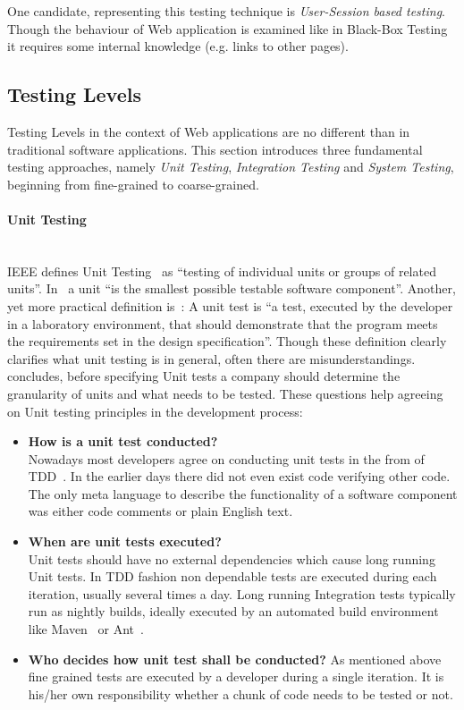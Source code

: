 \documentclass[12pt, notitlepage]{article}
\begin{document}
One candidate, representing this testing technique is \textit{User-Session based testing}. Though the behaviour of Web application is examined like in
Black-Box Testing it requires some internal knowledge (e.g. links to other pages).
\subsection{Testing Levels}
Testing Levels in the context of Web applications are no different than in traditional software applications. 
This section introduces three fundamental testing approaches, namely \textit{Unit Testing}, \textit{Integration Testing} and 
\textit{System Testing}, beginning from fine-grained to coarse-grained. 

\paragraph{Unit Testing} ~\\
IEEE defines Unit Testing~\cite{ieee-definition} as \enquote{testing of individual units or groups of related units}. In~\cite{sw-testing-quality-assurance}
a unit \enquote{is the smallest possible testable software component}. Another, yet more practical definition is~\cite{practical-unit-testing-definition}:
A unit test is \enquote{a test, executed by the developer in a laboratory environment, that should demonstrate that the program meets the requirements set in the design specification}. Though these definition clearly clarifies what unit testing is in general, often there are misunderstandings. ~\citet{unit-testing-survey} concludes,
before specifying Unit tests a company should determine the granularity of units and what needs to be tested.
These questions help agreeing on Unit testing principles in the development process:\\
\begin{itemize}
	\item \textbf{How is a unit test conducted?}\\
	Nowadays most developers agree on conducting unit tests in the from of TDD~\cite{beck-tdd}. 
	In the earlier days there did not even exist code verifying other code. The only meta language to describe the functionality of a software component was either
	code comments or plain English text.
	\item \textbf{When are unit tests executed?}\\
	Unit tests should have no external dependencies which cause long running Unit tests. In TDD fashion non dependable tests are executed during each iteration,
	usually several times a day. Long running Integration tests typically run as nightly builds, ideally executed by an automated build environment like
	Maven~\cite{maven} or Ant~\cite{ant}.
	\item \textbf{Who decides how unit test shall be conducted?}
	As mentioned above fine grained tests are executed by a developer during a single iteration. It is his/her own responsibility whether a chunk of code needs to
	be tested or not.
\end{itemize}
\end{document}
